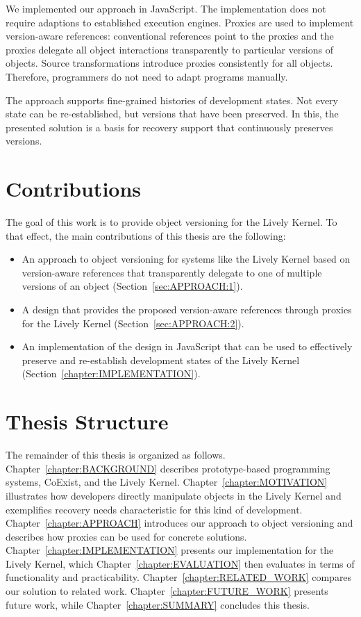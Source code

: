 We implemented our approach in JavaScript.
The implementation does not require adaptions to established execution engines.
Proxies are used to implement version-aware references: conventional references point to the proxies and the proxies delegate all object interactions transparently to particular versions of objects.
Source transformations introduce proxies consistently for all objects.
Therefore, programmers do not need to adapt programs manually.

The approach supports fine-grained histories of development states.
Not every state can be re-established, but versions that have been preserved.
In this, the presented solution is a basis for recovery support that continuously preserves versions.

\section{Contributions}

The goal of this work is to provide object versioning for the Lively Kernel.
To that effect, the main contributions of this thesis are the following:

\begin{itemize}
    \item An approach to object versioning for systems like the Lively Kernel based on version-aware references that transparently delegate to one of multiple versions of an object (Section~\ref{sec:APPROACH:1}).
    \item A design that provides the proposed version-aware references through proxies for the Lively Kernel (Section~\ref{sec:APPROACH:2}).
    \item An implementation of the design in JavaScript that can be used to effectively preserve and re-establish development states of the Lively Kernel (Section~\ref{chapter:IMPLEMENTATION}).
\end{itemize}


\section{Thesis Structure}

The remainder of this thesis is organized as follows. 
Chapter~\ref{chapter:BACKGROUND} describes prototype-based programming systems, CoExist, and the Lively Kernel.
Chapter~\ref{chapter:MOTIVATION} illustrates how developers directly manipulate objects in the Lively Kernel and exemplifies recovery needs characteristic for this kind of development.
Chapter~\ref{chapter:APPROACH} introduces our approach to object versioning and describes how proxies can be used for concrete solutions.
Chapter~\ref{chapter:IMPLEMENTATION} presents our implementation for the Lively Kernel, which Chapter~\ref{chapter:EVALUATION} then evaluates in terms of functionality and practicability.
Chapter~\ref{chapter:RELATED_WORK} compares our solution to related work.
Chapter~\ref{chapter:FUTURE_WORK} presents future work, while Chapter~\ref{chapter:SUMMARY} concludes this thesis.

